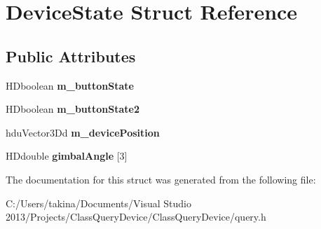 \hypertarget{struct_device_state}{}\section{Device\+State Struct Reference}
\label{struct_device_state}
\subsection*{Public Attributes}
\begin{DoxyCompactItemize}
\item 
\hypertarget{struct_device_state_ad7036ecdad8be5f6bc5083d329bd5b67}{}\label{struct_device_state_ad7036ecdad8be5f6bc5083d329bd5b67} 
H\+Dboolean {\bfseries m\+\_\+button\+State}
\item 
\hypertarget{struct_device_state_a6ea5d1953e068bf273e4adec913bd4af}{}\label{struct_device_state_a6ea5d1953e068bf273e4adec913bd4af} 
H\+Dboolean {\bfseries m\+\_\+button\+State2}
\item 
\hypertarget{struct_device_state_a057d757fddbc057604ddf7a67938fbc5}{}\label{struct_device_state_a057d757fddbc057604ddf7a67938fbc5} 
hdu\+Vector3\+Dd {\bfseries m\+\_\+device\+Position}
\item 
\hypertarget{struct_device_state_a2eb3ce210300a3e22150ce305d8b732d}{}\label{struct_device_state_a2eb3ce210300a3e22150ce305d8b732d} 
H\+Ddouble {\bfseries gimbal\+Angle} \mbox{[}3\mbox{]}
\end{DoxyCompactItemize}


The documentation for this struct was generated from the following file\+:\begin{DoxyCompactItemize}
\item 
C\+:/\+Users/takina/\+Documents/\+Visual Studio 2013/\+Projects/\+Class\+Query\+Device/\+Class\+Query\+Device/query.\+h\end{DoxyCompactItemize}
